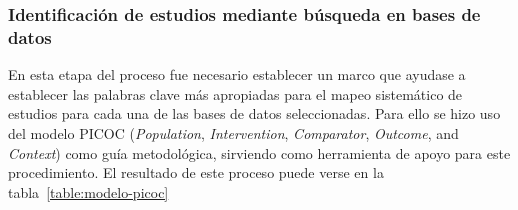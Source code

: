 \newpage
\subsubsection{Identificación de estudios mediante búsqueda en bases de datos}\label{subsubsec:identificacionEstudios}
En esta etapa del proceso fue necesario establecer un marco que ayudase a establecer las palabras clave más apropiadas para el mapeo sistemático de estudios para cada una de las bases de datos seleccionadas. Para ello se hizo uso del modelo PICOC (\textit{Population}, \textit{Intervention}, \textit{Comparator}, \textit{Outcome}, and \textit{Context}) como guía metodológica, sirviendo como herramienta de apoyo para este procedimiento. El resultado de este proceso puede verse en la tabla~\ref{table:modelo-picoc}

